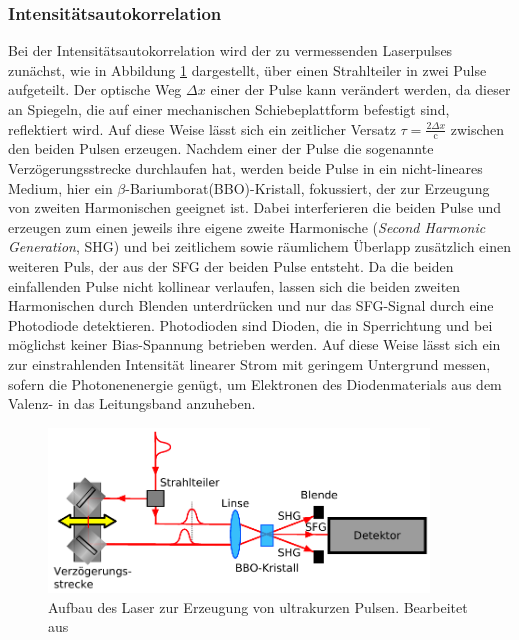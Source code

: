       \subsubsection{Intensitätsautokorrelation}  
        Bei der Intensitätsautokorrelation wird der zu vermessenden Laserpulses zunächst, wie in Abbildung \ref{fig:autokorrelator} dargestellt, über einen Strahlteiler in zwei Pulse aufgeteilt. 
        Der optische Weg $\Delta x$ einer der Pulse kann verändert werden, da dieser an Spiegeln, die auf einer mechanischen Schiebeplattform befestigt sind, reflektiert wird. Auf diese Weise lässt sich 
        ein zeitlicher Versatz $\tau=\frac{2\Delta x}{\text{c}}$ zwischen den beiden Pulsen erzeugen. Nachdem einer der Pulse die sogenannte Verzögerungsstrecke durchlaufen hat, werden beide Pulse in ein 
        nicht-lineares Medium, hier ein 
        $\beta$-Bariumborat(BBO)-Kristall, fokussiert, der zur Erzeugung von zweiten Harmonischen geeignet ist. Dabei interferieren die beiden Pulse und erzeugen zum einen jeweils ihre eigene zweite Harmonische 
        (\textit{Second Harmonic Generation}, SHG) und bei zeitlichem sowie räumlichem Überlapp zusätzlich einen weiteren Puls, der aus der SFG der beiden Pulse entsteht. Da die beiden einfallenden Pulse nicht 
        kollinear verlaufen, lassen sich die beiden zweiten Harmonischen durch Blenden unterdrücken und nur das SFG-Signal durch eine Photodiode detektieren. Photodioden sind Dioden, die in Sperrichtung und 
        bei möglichst keiner Bias-Spannung betrieben werden. Auf diese Weise lässt sich ein zur einstrahlenden Intensität linearer Strom mit geringem Untergrund messen, sofern die Photonenenergie genügt, um
        Elektronen des Diodenmaterials aus dem Valenz- in das Leitungsband anzuheben.  
        \FloatBarrier
        \begin{figure}[h]
          \centering
          \includegraphics[width = 0.9\textwidth]{pictures/autokorrelator.pdf}
          \caption{Aufbau des Laser zur Erzeugung von ultrakurzen Pulsen. Bearbeitet aus \cite{delong_frequency-resolved_1994}}
          \label{fig:autokorrelator}
        \end{figure}
